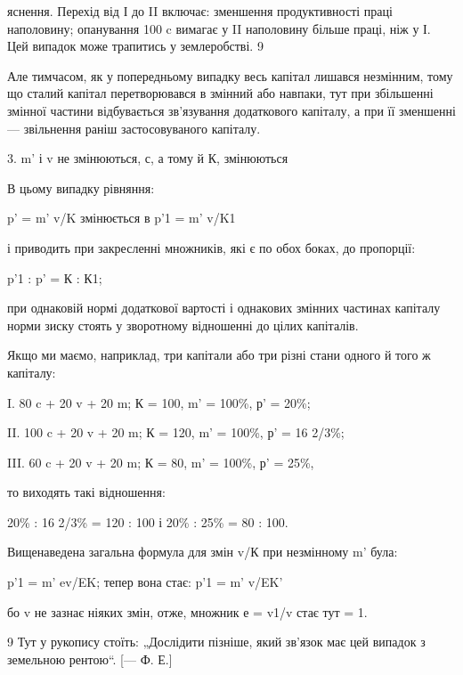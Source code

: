 яснення. Перехід від І до II включає: зменшення продуктивності
праці наполовину; опанування 100 c вимагає у II наполовину
більше праці, ніж у І. Цей випадок може трапитись у землеробстві. 9

Але тимчасом, як у попередньому випадку весь капітал
лишався незмінним, тому що сталий капітал перетворювався
в змінний або навпаки, тут при збільшенні змінної частини відбувається
зв’язування додаткового капіталу, а при її зменшенні —
звільнення раніш застосовуваного капіталу.

3. m' і v не змінюються, с, а тому й К, змінюються

В цьому випадку рівняння:

p' = m' v/K змінюється в p'1 = m' v/K1

і приводить при закресленні множників, які є по обох боках,
до пропорції:

p'1 : p' = К : К1;

при однаковій нормі додаткової вартості і однакових змінних
частинах капіталу норми зиску стоять у зворотному відношенні
до цілих капіталів.

Якщо ми маємо, наприклад, три капітали або три різні стани
одного й того ж капіталу:

I. 80 c + 20 v + 20 m; К = 100, m' = 100\%, р' = 20\%;

II. 100 c + 20 v + 20 m; К = 120, m' = 100\%, р' = 16 2/3\%;

III. 60 c + 20 v + 20 m; К = 80, m' = 100\%, р' = 25\%,

то виходять такі відношення:

20\% : 16 2/3\% = 120 : 100 і 20\% : 25\% = 80 : 100.

Вищенаведена загальна формула для змін v/К при незмінному
m' була:

p'1 = m' ev/EK; тепер вона стає: p'1 = m' v/EK'

бо v не зазнає ніяких змін, отже, множник е = v1/v стає тут = 1.

9 Тут у рукопису стоїть: „Дослідити пізніше, який зв’язок має цей випадок
з земельною рентою“. [— Ф. Е.]
